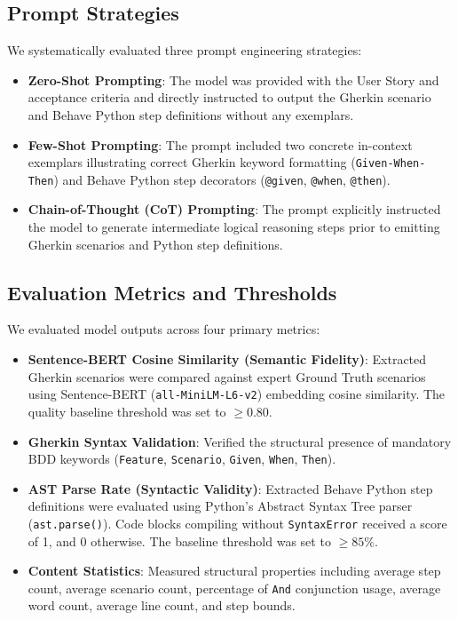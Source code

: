 \subsection{Prompt Strategies}
We systematically evaluated three prompt engineering strategies:
\begin{itemize}
    \item \textbf{Zero-Shot Prompting}: The model was provided with the User Story and acceptance criteria and directly instructed to output the Gherkin scenario and Behave Python step definitions without any exemplars.
    \item \textbf{Few-Shot Prompting}: The prompt included two concrete in-context exemplars illustrating correct Gherkin keyword formatting (\texttt{Given-When-Then}) and Behave Python step decorators (\texttt{@given}, \texttt{@when}, \texttt{@then}).
    \item \textbf{Chain-of-Thought (CoT) Prompting}: The prompt explicitly instructed the model to generate intermediate logical reasoning steps prior to emitting Gherkin scenarios and Python step definitions.
\end{itemize}

\subsection{Evaluation Metrics and Thresholds}
We evaluated model outputs across four primary metrics:
\begin{itemize}
    \item \textbf{Sentence-BERT Cosine Similarity (Semantic Fidelity)}: Extracted Gherkin scenarios were compared against expert Ground Truth scenarios using Sentence-BERT (\texttt{all-MiniLM-L6-v2}) embedding cosine similarity. The quality baseline threshold was set to $\ge 0.80$.
    \item \textbf{Gherkin Syntax Validation}: Verified the structural presence of mandatory BDD keywords (\texttt{Feature}, \texttt{Scenario}, \texttt{Given}, \texttt{When}, \texttt{Then}).
    \item \textbf{AST Parse Rate (Syntactic Validity)}: Extracted Behave Python step definitions were evaluated using Python's Abstract Syntax Tree parser (\texttt{ast.parse()}). Code blocks compiling without \texttt{SyntaxError} received a score of 1, and 0 otherwise. The baseline threshold was set to $\ge 85\%$.
    \item \textbf{Content Statistics}: Measured structural properties including average step count, average scenario count, percentage of \texttt{And} conjunction usage, average word count, average line count, and step bounds.
\end{itemize}

